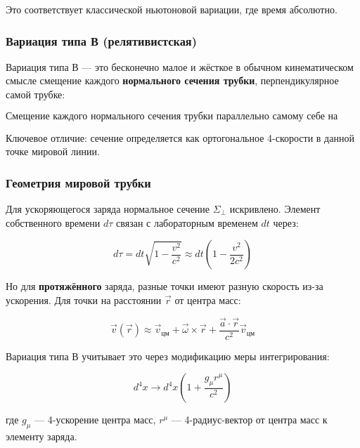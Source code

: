 \documentclass[12pt, a4paper]{article}
\begin{document}
Это соответствует классической ньютоновой вариации, где время абсолютно.

\subsubsection{Вариация типа В (релятивистская)}

Вариация типа В — это бесконечно малое и жёсткое в обычном кинематическом смысле смещение каждого \textbf{нормального сечения трубки}, перпендикулярное самой трубке:

\begin{equation}
\text{Смещение каждого нормального сечения трубки параллельно самому себе на произвольный отрезок}
\label{eq:variation_B}
\end{equation}

Ключевое отличие: сечение определяется как ортогональное 4-скорости в данной точке мировой линии.

\subsubsection{Геометрия мировой трубки}

Для ускоряющегося заряда нормальное сечение $\Sigma_\perp$ искривлено. Элемент собственного времени $d\tau$ связан с лабораторным временем $dt$ через:

\begin{equation}
d\tau = dt \sqrt{1 - \frac{v^2}{c^2}} \approx dt \left(1 - \frac{v^2}{2c^2}\right)
\label{eq:proper_time}
\end{equation}

Но для \textbf{протяжённого} заряда, разные точки имеют разную скорость из-за ускорения. Для точки на расстоянии $\vec{r}$ от центра масс:

\begin{equation}
\vec{v}(\vec{r}) \approx \vec{v}_{\text{цм}} + \vec{\omega} \times \vec{r} + \frac{\vec{a} \cdot \vec{r}}{c^2} \vec{v}_{\text{цм}}
\label{eq:velocity_distribution}
\end{equation}

Вариация типа В учитывает это через модификацию меры интегрирования:

\begin{equation}
d^4x \longrightarrow d^4x \left(1 + \frac{g_\mu r^\mu}{c^2}\right)
\label{eq:measure_fermi}
\end{equation}

где $g_\mu$ — 4-ускорение центра масс, $r^\mu$ — 4-радиус-вектор от центра масс к элементу заряда.
\end{document}
